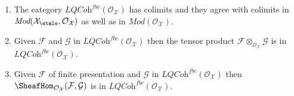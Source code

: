 \begin{proposition}
\begin{enumerate}
\item The category $\textit{LQCoh}^{fbc}(\mathcal{O}_\mathcal{X})$ has
colimits and they agree with colimits in
$\textit{Mod}(\mathcal{X}_\etale, \mathcal{O}_\mathcal{X})$
as well as in $\textit{Mod}(\mathcal{O}_\mathcal{X})$.
\item Given $\mathcal{F}$ and $\mathcal{G}$ in
$\textit{LQCoh}^{fbc}(\mathcal{O}_\mathcal{X})$ then the tensor product
$\mathcal{F} \otimes_{\mathcal{O}_\mathcal{X}} \mathcal{G}$
is in $\textit{LQCoh}^{fbc}(\mathcal{O}_\mathcal{X})$.
\item Given $\mathcal{F}$ of finite presentation and $\mathcal{G}$ in
$\textit{LQCoh}^{fbc}(\mathcal{O}_\mathcal{X})$ then
$\SheafHom_{\mathcal{O}_\mathcal{X}}(\mathcal{F}, \mathcal{G})$
is in $\textit{LQCoh}^{fbc}(\mathcal{O}_\mathcal{X})$.
\end{enumerate}
\end{proposition}

